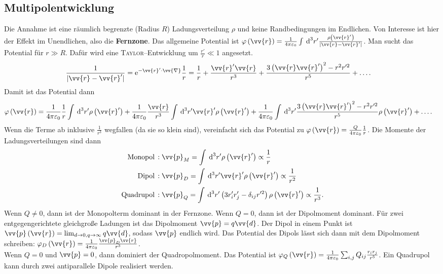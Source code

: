 \documentclass[a4paper,12pt]{article}
\newcommand{\td}{\,\text{d}}
\numberwithin{equation}{section}
\begin{document}
\subsection{Multipolentwicklung}
Die Annahme ist eine räumlich begrenzte (Radius $R$) Ladungsverteilung $\rho $ und keine Randbedingungen im Endlichen. Von Interesse ist hier der Effekt im Unendlichen, also die \textbf{Fernzone}. Das allgemeine Potential ist $\varphi \left(\vv{r}\right)=\tfrac{1}{4\pi \varepsilon _0}\int_{}^{}\td ^3r'\tfrac{\rho \left(\vv{r}'\right)}{|\vv{r}-\vv{r}'|}$. Man sucht das Potential für $r\gg R$. Dafür wird eine \textsc{Taylor}--Entwicklung um $\tfrac{r'}{r}\ll 1$ angesetzt.
\begin{align} 
        \dfrac{1}{|\vv{r}-\vv{r}'|}&=\text{e}^{-\vv{r}'\cdot \vv{\nabla }}\dfrac{1}{r}=\dfrac{1}{r}+\dfrac{\vv{r}'\vv{r}}{r^3}+\dfrac{3\left(\vv{r}\vv{r}'\right)^2-r^2r'^2}{r^5}+\hdots 
.\end{align} 
Damit ist das Potential dann
\begin{align} 
        \varphi \left(\vv{r}\right)&=\dfrac{1}{4\pi \varepsilon _0}\dfrac{1}{r}\int_{}^{}\td ^3r'\rho \left(\vv{r}'\right)+\dfrac{1}{4\pi \varepsilon _0}\dfrac{\vv{r}}{r^3}\int_{}^{}\td ^3r'\vv{r}'\rho \left(\vv{r}'\right)+\dfrac{1}{4\pi \varepsilon _0}\int_{}^{}\td ^3r'\dfrac{3\left(\vv{r}\vv{r}'\right)^2-r^2r'^2}{r^5}\rho \left(\vv{r}'\right)+\hdots 
.\end{align}
Wenn die Terme ab inklusive $\tfrac{1}{r^3}$ wegfallen (da sie so klein sind), vereinfacht sich das Potential zu $\varphi \left(\vv{r}\right)=\tfrac{Q}{4\pi \varepsilon _0}\tfrac{1}{r}$. Die Momente der Ladungsverteilungen sind dann
\begin{align} 
        \,\text{Monopol}\,&:\vv{p}_M=\int_{}^{}\td ^3r'\rho \left(\vv{r}'\right)\propto \dfrac{1}{r}\\
        \,\text{Dipol}\,&:\vv{p}_D=\int_{}^{}\td ^3r'\vv{r}'\rho \left(\vv{r}'\right)\propto \dfrac{1}{r^2}\\
        \,\text{Quadrupol}\,&:\vv{p}_Q=\int_{}^{}\td ^3r'\left(3r_i'r_j'-\delta _{ij}r'^2\right)\rho \left(\vv{r}'\right)\propto \dfrac{1}{r^3}
.\end{align} 
Wenn $Q\neq 0$, dann ist der Monopolterm dominant in der Fernzone. Wenn $Q=0$, dann ist der Dipolmoment dominant. Für zwei entgegengerichtete gleichgroße Ladungen ist das Dipolmoment $\vv{p}=q\vv{d}$. Der Dipol in einem Punkt ist $\vv{p}\left(\vv{r}\right)=\lim_{d\rightarrow 0,q\rightarrow \infty}q\vv{d}$, sodass $\vv{p}$ endlich wird.
Das Potential des Dipols lässt sich dann mit dem Dipolmoment schreiben: $\varphi _D\left(\vv{r}\right)=\tfrac{1}{4\pi \varepsilon _0}\tfrac{\vv{p}_D\vv{r}}{r^3}$.\\\indent
Wenn $Q=0$ und $\vv{p}=0$, dann dominiert der Quadropolmoment. Das Potential ist $\varphi _Q\left(\vv{r}\right)=\tfrac{1}{4\pi \varepsilon _0}\sum_{i,j}^{}Q_{ij}\tfrac{r_ir_j}{r^5}$. Ein Quadrupol kann durch zwei antiparallele Dipole realisiert werden.
\end{document}
